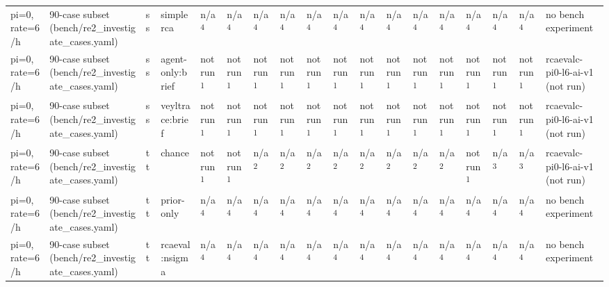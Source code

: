 \begin{table}[t]
\begin{tabular}{llllllllllllllllll}
pi=0, rate=6/h & 90-case subset (bench/re2\_investigate\_cases.yaml) & ss & simplerca & n/a\textsuperscript{4} & n/a\textsuperscript{4} & n/a\textsuperscript{4} & n/a\textsuperscript{4} & n/a\textsuperscript{4} & n/a\textsuperscript{4} & n/a\textsuperscript{4} & n/a\textsuperscript{4} & n/a\textsuperscript{4} & n/a\textsuperscript{4} & n/a\textsuperscript{4} & n/a\textsuperscript{4} & n/a\textsuperscript{4} & no bench experiment \\
pi=0, rate=6/h & 90-case subset (bench/re2\_investigate\_cases.yaml) & ss & agent-only:brief & not run\textsuperscript{1} & not run\textsuperscript{1} & not run\textsuperscript{1} & not run\textsuperscript{1} & not run\textsuperscript{1} & not run\textsuperscript{1} & not run\textsuperscript{1} & not run\textsuperscript{1} & not run\textsuperscript{1} & not run\textsuperscript{1} & not run\textsuperscript{1} & not run\textsuperscript{1} & not run\textsuperscript{1} & rcaevalc-pi0-l6-ai-v1 (not run) \\
pi=0, rate=6/h & 90-case subset (bench/re2\_investigate\_cases.yaml) & ss & veyltrace:brief & not run\textsuperscript{1} & not run\textsuperscript{1} & not run\textsuperscript{1} & not run\textsuperscript{1} & not run\textsuperscript{1} & not run\textsuperscript{1} & not run\textsuperscript{1} & not run\textsuperscript{1} & not run\textsuperscript{1} & not run\textsuperscript{1} & not run\textsuperscript{1} & not run\textsuperscript{1} & not run\textsuperscript{1} & rcaevalc-pi0-l6-ai-v1 (not run) \\
pi=0, rate=6/h & 90-case subset (bench/re2\_investigate\_cases.yaml) & tt & chance & not run\textsuperscript{1} & not run\textsuperscript{1} & n/a\textsuperscript{2} & n/a\textsuperscript{2} & n/a\textsuperscript{2} & n/a\textsuperscript{2} & n/a\textsuperscript{2} & n/a\textsuperscript{2} & n/a\textsuperscript{2} & n/a\textsuperscript{2} & not run\textsuperscript{1} & n/a\textsuperscript{3} & n/a\textsuperscript{3} & rcaevalc-pi0-l6-ai-v1 (not run) \\
pi=0, rate=6/h & 90-case subset (bench/re2\_investigate\_cases.yaml) & tt & prior-only & n/a\textsuperscript{4} & n/a\textsuperscript{4} & n/a\textsuperscript{4} & n/a\textsuperscript{4} & n/a\textsuperscript{4} & n/a\textsuperscript{4} & n/a\textsuperscript{4} & n/a\textsuperscript{4} & n/a\textsuperscript{4} & n/a\textsuperscript{4} & n/a\textsuperscript{4} & n/a\textsuperscript{4} & n/a\textsuperscript{4} & no bench experiment \\
pi=0, rate=6/h & 90-case subset (bench/re2\_investigate\_cases.yaml) & tt & rcaeval:nsigma & n/a\textsuperscript{4} & n/a\textsuperscript{4} & n/a\textsuperscript{4} & n/a\textsuperscript{4} & n/a\textsuperscript{4} & n/a\textsuperscript{4} & n/a\textsuperscript{4} & n/a\textsuperscript{4} & n/a\textsuperscript{4} & n/a\textsuperscript{4} & n/a\textsuperscript{4} & n/a\textsuperscript{4} & n/a\textsuperscript{4} & no bench experiment \\

\end{tabular}
\end{table}
